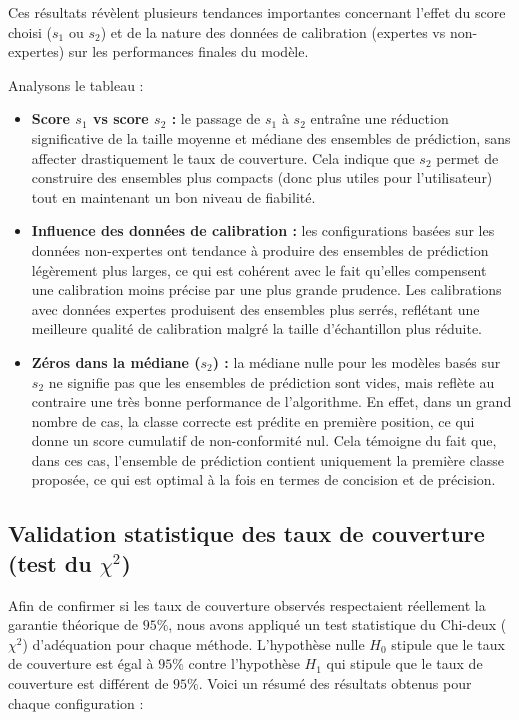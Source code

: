 \documentclass[a4paper,12pt]{article}
\begin{document}
Ces résultats révèlent plusieurs tendances importantes concernant l'effet du score choisi ($s_1$ ou $s_2$) et de la nature des données de calibration (expertes vs non-expertes) sur les performances finales du modèle.

Analysons le tableau : 

\begin{itemize}
    \item \textbf{Score $s_1$ vs score $s_2$ :} le passage de $s_1$ à $s_2$ entraîne une réduction significative de la taille moyenne et médiane des ensembles de prédiction, sans affecter drastiquement le taux de couverture. Cela indique que $s_2$ permet de construire des ensembles plus compacts (donc plus utiles pour l'utilisateur) tout en maintenant un bon niveau de fiabilité.
    \item \textbf{Influence des données de calibration :} les configurations basées sur les données non-expertes ont tendance à produire des ensembles de prédiction légèrement plus larges, ce qui est cohérent avec le fait qu’elles compensent une calibration moins précise par une plus grande prudence. Les calibrations avec données expertes produisent des ensembles plus serrés, reflétant une meilleure qualité de calibration malgré la taille d’échantillon plus réduite.
    \item \textbf{Zéros dans la médiane ($s_2$) :} la médiane nulle pour les modèles basés sur $s_2$ ne signifie pas que les ensembles de prédiction sont vides, mais reflète au contraire une très bonne performance de l'algorithme. En effet, dans un grand nombre de cas, la classe correcte est prédite en première position, ce qui donne un score cumulatif de non-conformité nul. Cela témoigne du fait que, dans ces cas, l'ensemble de prédiction contient uniquement la première classe proposée, ce qui est optimal à la fois en termes de concision et de précision.
\end{itemize}

\subsection{Validation statistique des taux de couverture (test du $\chi^2$)}

Afin de confirmer si les taux de couverture observés respectaient réellement la garantie théorique de $95\%$, nous avons appliqué un test statistique du Chi-deux ($\chi^2$) d’adéquation pour chaque méthode. L’hypothèse nulle $H_0$ stipule que le taux de couverture est égal à $95\%$ contre l'hypothèse $H_1$ qui stipule que le taux de couverture est différent de $95\%$. Voici un résumé des résultats obtenus pour chaque configuration :
\end{document}
